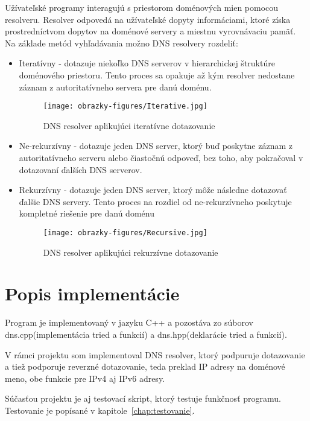 Užívateľské programy interagujú s priestorom doménových mien pomocou resolveru. Resolver odpovedá na užívateľské dopyty informáciami, ktoré získa prostredníctvom dopytov na doménové servery a miestnu vyrovnávaciu pamäť. Na základe metód vyhľadávania možno DNS resolvery rozdeliť:
\begin{itemize}
    \item Iteratívny - dotazuje niekoľko DNS serverov v hierarchickej štruktúre doménového priestoru. Tento proces sa opakuje až kým resolver nedostane záznam z autoritatívneho servera pre danú doménu.
    \begin{figure}[!ht]
        \centering     %
        \texttt{[image: obrazky-figures/Iterative.jpg]}
        \caption{DNS resolver aplikujúci iteratívne dotazovanie}
        \label{fig:iterative-DNS-resolver}
    \end{figure}
    
    \item Ne-rekurzívny - dotazuje jeden DNS server, ktorý buď poskytne záznam z autoritatívneho serveru alebo čiastočnú odpoveď, bez toho, aby pokračoval v dotazovaní ďalších DNS serverov.
    
    \item Rekurzívny - dotazuje jeden DNS server, ktorý môže následne dotazovať ďalšie DNS servery. Tento proces na rozdiel od ne-rekurzívneho poskytuje kompletné riešenie pre danú doménu
    
    \begin{figure}[!ht]
        \centering     %
        \texttt{[image: obrazky-figures/Recursive.jpg]}
        \caption{DNS resolver aplikujúci rekurzívne dotazovanie}
        \label{fig:recursive-DNS-resolver}
    \end{figure}
\end{itemize}

\chapter{Popis implementácie}
Program je implementovaný v jazyku C++ a pozostáva zo súborov dns.cpp(implementácia tried a funkcií) a dns.hpp(deklarácie tried a funkcií).

V rámci projektu som implementoval DNS resolver, ktorý podpuruje dotazovanie a tiež podporuje reverzné dotazovanie, teda preklad IP adresy na doménové meno, obe funkcie pre IPv4 aj IPv6 adresy.

Súčasťou projektu je aj testovací skript, ktorý testuje funkčnosť programu. Testovanie je popísané v kapitole~\ref{chap:testovanie}.

